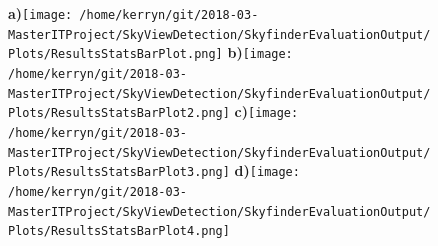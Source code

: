\documentclass{article}
\begin{document}
\clearpage %

\begin{figure}
\centering 
\textbf{\scriptsize{a)}}\texttt{[image: /home/kerryn/git/2018-03-MasterITProject/SkyViewDetection/SkyfinderEvaluationOutput/Plots/ResultsStatsBarPlot.png]}
\textbf{\scriptsize{b)}}\texttt{[image: /home/kerryn/git/2018-03-MasterITProject/SkyViewDetection/SkyfinderEvaluationOutput/Plots/ResultsStatsBarPlot2.png]}
\textbf{\scriptsize{c)}}\texttt{[image: /home/kerryn/git/2018-03-MasterITProject/SkyViewDetection/SkyfinderEvaluationOutput/Plots/ResultsStatsBarPlot3.png]} 
\textbf{\scriptsize{d)}}\texttt{[image: /home/kerryn/git/2018-03-MasterITProject/SkyViewDetection/SkyfinderEvaluationOutput/Plots/ResultsStatsBarPlot4.png]}

\end{figure} 



\clearpage %
\end{document}
